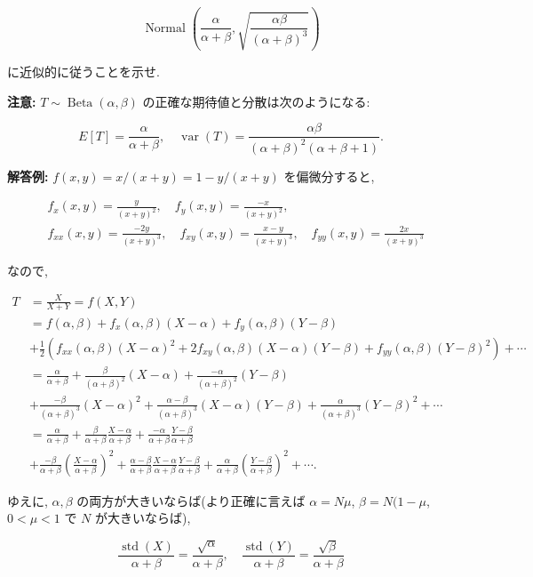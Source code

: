 \documentclass[
  letterpaper,
  DIV=11,
  numbers=noendperiod]{scrartcl}
\begin{document}
\[
\operatorname{Normal}\left(\frac{\alpha}{\alpha+\beta}, \sqrt{\frac{\alpha\beta}{(\alpha+\beta)^3}}\right)
\]

に近似的に従うことを示せ.

\textbf{注意:} \(T\sim \operatorname{Beta}(\alpha,\beta)\)
の正確な期待値と分散は次のようになる:

\[
E[T] = \frac{\alpha}{\alpha+\beta}, \quad
\operatorname{var}(T) = \frac{\alpha\beta}{(\alpha+\beta)^2(\alpha+\beta+1)}.
\]

\textbf{解答例:} \(f(x,y) = x/(x+y) = 1 - y/(x+y)\) を偏微分すると,

\[
\begin{aligned}
&
f_x(x,y) = \frac{y}{(x+y)^2}, \quad
f_y(x,y) = \frac{-x}{(x+y)^2},
\\ &
f_{xx}(x,y) = \frac{-2y}{(x+y)^3}, \quad
f_{xy}(x,y) = \frac{x-y}{(x+y)^3}, \quad
f_{yy}(x,y) = \frac{2x}{(x+y)^3}
\end{aligned}
\]

なので,

\[
\begin{aligned}
T &= \frac{X}{X+Y} = f(X,Y)
\\ &=
f(\alpha, \beta) + f_x(\alpha,\beta)(X-\alpha) + f_y(\alpha,\beta)(Y-\beta)
\\ &+
\frac{1}{2}\left(
f_{xx}(\alpha,\beta)(X-\alpha)^2 +
2f_{xy}(\alpha,\beta)(X-\alpha)(Y-\beta) +
f_{yy}(\alpha,\beta)(Y-\beta)^2
\right) + \cdots
\\ &=
\frac{\alpha}{\alpha+\beta} +
\frac{\beta}{(\alpha+\beta)^2}(X-\alpha) +
\frac{-\alpha}{(\alpha+\beta)^2}(Y-\beta)
\\ &+
\frac{-\beta}{(\alpha+\beta)^3}(X-\alpha)^2 +
\frac{\alpha-\beta}{(\alpha+\beta)^3}(X-\alpha)(Y-\beta) +
\frac{\alpha}{(\alpha+\beta)^3}(Y-\beta)^2
+ \cdots
\\ &=
\frac{\alpha}{\alpha+\beta} +
\frac{\beta}{\alpha+\beta}\frac{X-\alpha}{\alpha+\beta} +
\frac{-\alpha}{\alpha+\beta}\frac{Y-\beta}{\alpha+\beta}
\\ &+
\frac{-\beta}{\alpha+\beta}\left(\frac{X-\alpha}{\alpha+\beta}\right)^2 +
\frac{\alpha-\beta}{\alpha+\beta}
\frac{X-\alpha}{\alpha+\beta}\frac{Y-\beta}{\alpha+\beta} +
\frac{\alpha}{\alpha+\beta}\left(\frac{Y-\beta}{\alpha+\beta}\right)^2
+ \cdots.
\end{aligned}
\]

ゆえに, \(\alpha, \beta\) の両方が大きいならば(より正確に言えば
\(\alpha=N\mu\), \(\beta=N(1-\mu\), \(0<\mu<1\) で \(N\)
が大きいならば),

\[
\frac{\operatorname{std}(X)}{\alpha+\beta} = \frac{\sqrt{\alpha}}{\alpha+\beta}, \quad
\frac{\operatorname{std}(Y)}{\alpha+\beta} = \frac{\sqrt{\beta}}{\alpha+\beta}
\]
\end{document}
